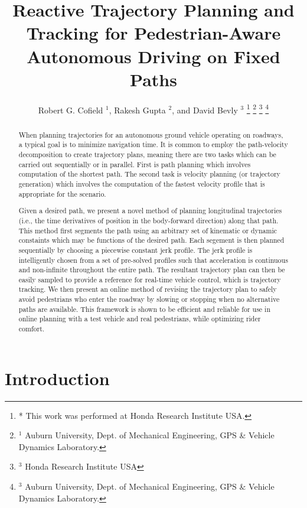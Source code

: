 \documentclass[letterpaper, 10 pt, conference]{ieeeconf}  %
\title{\LARGE \bf
  Reactive Trajectory Planning and Tracking for Pedestrian-Aware Autonomous Driving on Fixed Paths
}
\author{
  Robert G. Cofield $^{1}$,
  Rakesh Gupta $^{2}$,
  and
  David Bevly $^{3}$
  \thanks{
    * This work was performed at Honda Research Institute USA.
  }
  \thanks{
    $^{1}$ Auburn University, Dept. of Mechanical Engineering, GPS \& Vehicle Dynamics Laboratory.
  }
  \thanks{
    $^{3}$ Honda Research Institute USA
  }
  \thanks{
    $^{3}$ Auburn University, Dept. of Mechanical Engineering, GPS \& Vehicle Dynamics Laboratory.
  }
}
\begin{document}
\maketitle
\thispagestyle{empty}
\pagestyle{empty}

\begin{abstract}

When planning trajectories for an autonomous ground vehicle operating on roadways, a typical goal is to minimize navigation time.
It is common to employ the path-velocity decomposition to create trajectory plans, meaning there are two tasks which can be carried out sequentially or in parallel.
First is path planning which involves computation of the shortest path.
The second task is velocity planning (or trajectory generation) which involves the computation of the fastest velocity profile that is appropriate for the scenario.

Given a desired path, we present a novel method of planning longitudinal trajectories (i.e., the time derivatives of position in the body-forward direction) along that path.
This method first segments the path using an arbitrary set of kinematic or dynamic constaints which may be functions of the desired path.
Each segement is then planned sequentially by choosing a piecewise constant jerk profile.
The jerk profile is intelligently chosen from a set of pre-solved profiles such that acceleration is continuous and non-infinite throughout the entire path.
The resultant trajectory plan can then be easily sampled to provide a reference for real-time vehicle control, which is trajectory tracking.
We then present an online method of revising the trajectory plan to safely avoid pedestrians who enter the roadway by slowing or stopping when no alternative paths are available.
This framework is shown to be efficient and reliable for use in online planning with a test vehicle and real pedestrians, while optimizing rider comfort.

\end{abstract}

\section{Introduction} \label{sec:introduction}
\end{document}

